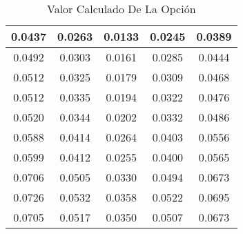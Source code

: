 \begin{table}                                
\centering                                   
\begin{tabular}{|c|c|c|c|c|}                 
\hline                                       
0.0437 & 0.0263 & 0.0133 & 0.0245 & 0.0389 \\
\hline                                       
0.0492 & 0.0303 & 0.0161 & 0.0285 & 0.0444 \\
\hline                                       
0.0512 & 0.0325 & 0.0179 & 0.0309 & 0.0468 \\
\hline                                       
0.0512 & 0.0335 & 0.0194 & 0.0322 & 0.0476 \\
\hline                                       
0.0520 & 0.0344 & 0.0202 & 0.0332 & 0.0486 \\
\hline                                       
0.0588 & 0.0414 & 0.0264 & 0.0403 & 0.0556 \\
\hline                                       
0.0599 & 0.0412 & 0.0255 & 0.0400 & 0.0565 \\
\hline                                       
0.0706 & 0.0505 & 0.0330 & 0.0494 & 0.0673 \\
\hline                                       
0.0726 & 0.0532 & 0.0358 & 0.0522 & 0.0695 \\
\hline                                       
0.0705 & 0.0517 & 0.0350 & 0.0507 & 0.0673 \\
\hline                                       
\end{tabular}                                
\caption{Valor Calculado De La Opción}                     
\label{table:MyTableLabel}                   
\end{table}  

